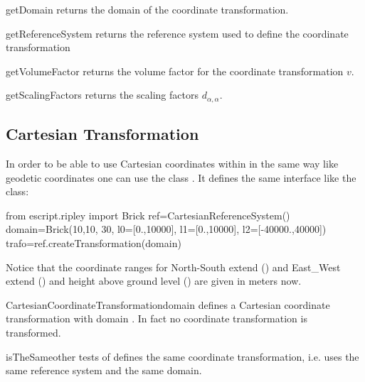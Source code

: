 \begin{methoddesc}[GeodeticCoordinateTransformation]{getDomain}{}
returns the domain of the coordinate transformation.
\end{methoddesc}


\begin{methoddesc}[GeodeticCoordinateTransformation]{getReferenceSystem}{}
returns the reference system used to define the coordinate transformation
\end{methoddesc}


\begin{methoddesc}[GeodeticCoordinateTransformation]{getVolumeFactor}{}
returns the volume factor for the coordinate transformation $v$.
\end{methoddesc}


\begin{methoddesc}[GeodeticCoordinateTransformation]{getScalingFactors}{}
returns the scaling factors $d_{\alpha, \alpha}$.
\end{methoddesc}

\subsection{Cartesian Transformation}
In order to be able to use Cartesian coordinates  within \downunder in the same way like geodetic coordinates 
one can use the class .  It defines the same interface 
like the 
 class:
\begin{python}
from escript.ripley import Brick
ref=CartesianReferenceSystem()
domain=Brick(10,10, 30, l0=[0.,10000], l1=[0.,10000], l2=[-40000.,40000])
trafo=ref.createTransformation(domain)
\end{python}
Notice that the coordinate ranges for North-South extend () and 
East_West extend () and height above ground level ()  are given in meters now.

\begin{classdesc}{CartesianCoordinateTransformation}{domain}
defines a Cartesian coordinate transformation with domain . In fact no coordinate transformation is
transformed.  
\end{classdesc}


\begin{methoddesc}[CartesianCoordinateTransformation]{isTheSame}{other}
tests of  defines the same coordinate transformation, i.e. uses the same reference system and the same domain.
\end{methoddesc}


